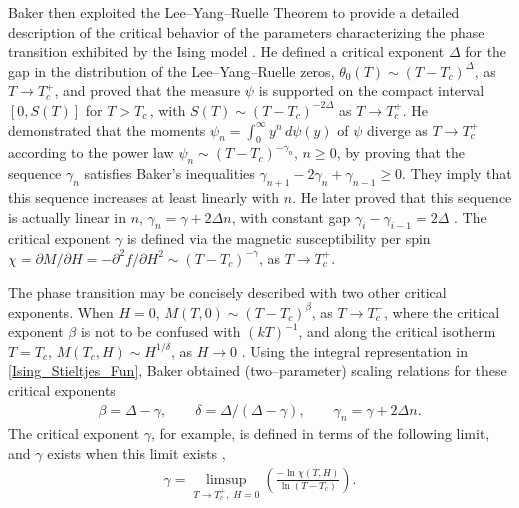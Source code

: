 \documentclass[english,12pt,jmp,graphicx]{revtex4-1}
\begin{document}
Baker \cite{Baker:PRB:1184,Baker-1990} then exploited the
Lee--Yang--Ruelle Theorem to provide a detailed description of the 
critical behavior of the parameters characterizing 
the phase transition exhibited by the Ising model
\cite{Christensen-2005}. He defined a critical 
exponent $\Delta$ for the gap in the distribution of the Lee--Yang--Ruelle
zeros, $\theta_0(T)\sim(T-T_c)^\Delta$, as $T\to T_c^+$, and proved that
the measure $\psi$ is supported on the compact interval
$[0,S(T)]$ for $T>T_c\,$, with $S(T)\sim(T-T_c)^{-2\Delta}$ as
$T\to T_c^+$. He demonstrated that the moments $\psi_n=\int_0^\infty y^n\,d\psi(y)$ of $\psi$
diverge as $T\to T_c^+$ according to the power law $\psi_n\sim(T-T_c)^{-\gamma_n}$,
$n\geq0$, by proving that the sequence $\gamma_n$ satisfies Baker's
inequalities $\gamma_{n+1}-2\gamma_n+\gamma_{n-1}\geq0$. They imply that this sequence
increases at least linearly with $n$. He later proved that this
sequence is actually linear in $n$, $\gamma_n=\gamma+2\Delta n$, with constant gap
$\gamma_i-\gamma_{i-1}=2\Delta$ \cite{Baker-1990}. The critical exponent $\gamma$ is
defined via the magnetic susceptibility per spin $\chi=\partial M/\partial H=-\partial^2f/\partial
H^2\sim(T-T_c)^{-\gamma}$, as $T\to T_c^+$. 

The phase transition may be concisely described with two
other critical exponents. When $H=0$, $M(T,0)\sim(T-T_c)^\beta$, as $T\to T_c^-$,
where the critical exponent $\beta$ is not to be confused with
$(kT)^{-1}$, and along the critical isotherm $T=T_c$, $M(T_c,H)\sim H^{1/\delta}$,
as $H\to0$ \cite{Christensen-2005,Baker-1990}. Using the integral
representation in \eqref{Ising_Stieltjes_Fun}, Baker obtained 
(two--parameter) scaling relations for these critical exponents
\cite{Baker-1990} 
%
\begin{align}\label{eq:Ising_Scaling_Relations}
  \beta=\Delta-\gamma, \qquad \delta=\Delta/(\Delta-\gamma), \qquad \gamma_n=\gamma+2\Delta n.
\end{align}
%
The critical exponent $\gamma$, for example, is defined
in terms of the following limit, and $\gamma$ exists when this limit exists
\cite{Baker-1990},
% 
\begin{align}\label{eq:Critical_Exponent_Existence}
  \gamma=\limsup_{T\to T_c^+, \;H=0}\left(\frac{-\ln \chi(T,H)}{\ln(T-T_c)}  \right).
\end{align}
%
\end{document}
